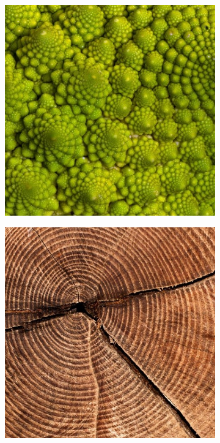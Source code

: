 \documentclass[fontsize=12pt, appendixprefix=true]{scrreprt}
\begin{document}
\begin{figure}[ht!]
	\centering
	\begin{subfigure}[b]{0.225\textwidth}
		\centering
		\includegraphics[width=\textwidth]{img/nat_pat_01.jpg}
		\caption{}    
	\end{subfigure}
	\hspace{10 mm}
	\begin{subfigure}[b]{0.225\textwidth}  
		\centering 
		\includegraphics[width=\textwidth]{img/nat_pat_02.jpg}

\end{subfigure}
\end{figure}
\end{document}
